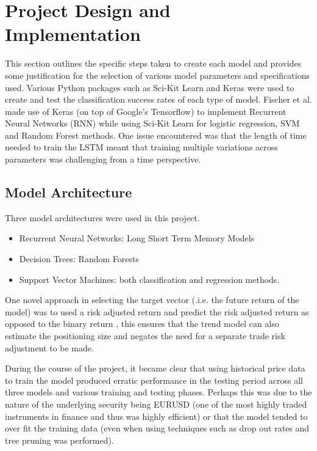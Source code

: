 \documentclass[11pt]{article}
\begin{document}
\section{Project Design and Implementation} \label{ProjectD}
This section outlines the specific steps taken to create each model and provides some justification for the selection of various model parameters and specifications used.
Various Python packages such as Sci-Kit Learn and Keras were used to create and test the classification success rates of each type of model. Fischer et al. made use of Keras (on top of Google's Tensorflow) to implement Recurrent Neural Networks (RNN) \cite{Fischer2018} while using Sci-Kit Learn for logistic regression, SVM and Random Forest methods. \newline One issue encountered was that the length of time needed to train the LSTM meant that training multiple variations across parameters was challenging from a time perspective. 
\subsection{Model Architecture}
Three model architectures were used in this project.
\begin{itemize}
 \item Recurrent Neural Networks: Long Short Term Memory Models
\item Decision Trees: Random Forests
\item Support Vector Machines: both classification and regression methods. 
\end{itemize}
One novel approach in selecting the target vector (.i.e. the future return of the model) was to used a risk adjusted return and predict the risk adjusted return as opposed to the binary return \cite{Lim2019}, this ensures that the trend model can also estimate the positioning size and negates the need for a separate trade risk adjustment to be made. \newline
 
During the course of the project, it became clear that using historical price data to train the model produced erratic performance in the testing period across all three models and various training and testing phases. Perhaps this was due to the nature of the underlying security being EURUSD (one of the most highly traded instruments in finance and thus was highly efficient) or that the model tended to over fit the training data (even when using techniques such as drop out rates and tree pruning was performed). 
\end{document}
